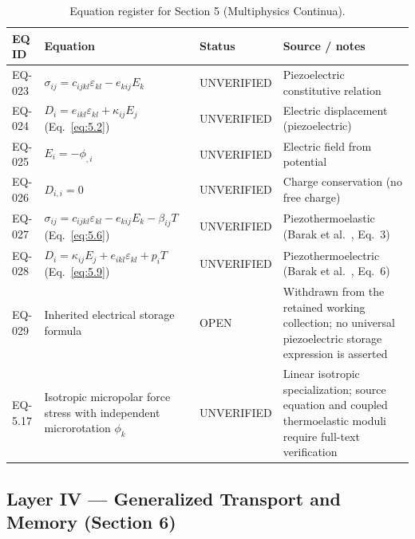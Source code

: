\begin{table}[htbp]
\centering
\small
\setlength{\tabcolsep}{3pt}
\caption{Equation register for Section 5 (Multiphysics Continua).}
\label{tab:appA-sec5}
\begin{tabularx}{\textwidth}{@{}p{1.6cm}Y p{2.8cm}Y@{}}
\toprule
\textbf{EQ ID} & \textbf{Equation} & \textbf{Status} & \textbf{Source / notes} \\
\midrule
EQ-023 & $\sigma_{ij} = c_{ijkl}\varepsilon_{kl} - e_{kij}E_k$ & UNVERIFIED & Piezoelectric constitutive relation \\
EQ-024 & $D_i = e_{ikl}\varepsilon_{kl} + \kappa_{ij}E_j$\;(Eq.~\eqref{eq:5.2}) & UNVERIFIED & Electric displacement (piezoelectric) \\
EQ-025 & $E_i = -\phi_{,i}$ & UNVERIFIED & Electric field from potential \\
EQ-026 & $D_{i,i} = 0$ & UNVERIFIED & Charge conservation (no free charge) \\
EQ-027 & $\sigma_{ij} = c_{ijkl}\varepsilon_{kl} - e_{kij}E_k - \beta_{ij}T$\;(Eq.~\eqref{eq:5.6}) & UNVERIFIED & Piezothermoelastic (Barak et al.~\cite{Barak2023}, Eq.~3) \\
EQ-028 & $D_i = \kappa_{ij}E_j + e_{ikl}\varepsilon_{kl} + p_i T$\;(Eq.~\eqref{eq:5.9}) & UNVERIFIED & Piezothermoelectric (Barak et al.~\cite{Barak2023}, Eq.~6) \\
EQ-029 & Inherited electrical storage formula & OPEN & Withdrawn from the retained working collection; no universal piezoelectric storage expression is asserted \\
EQ-5.17 & Isotropic micropolar force stress with independent microrotation $\phi_k$ & UNVERIFIED & Linear isotropic specialization; source equation and coupled thermoelastic moduli require full-text verification \\
\bottomrule
\end{tabularx}
\end{table}

\subsection{Layer IV — Generalized Transport and Memory (Section 6)}

